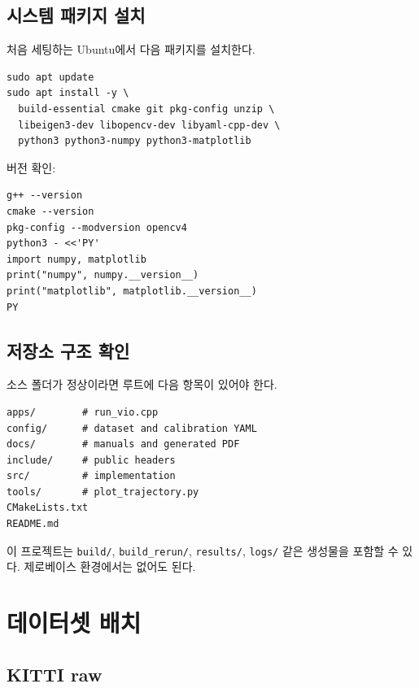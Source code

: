 \documentclass[11pt,a4paper,oneside]{report}
\begin{document}
\section{시스템 패키지 설치}

처음 세팅하는 Ubuntu에서 다음 패키지를 설치한다.

\begin{lstlisting}[style=shell,caption={필수 빌드 및 실행 의존성}]
sudo apt update
sudo apt install -y \
  build-essential cmake git pkg-config unzip \
  libeigen3-dev libopencv-dev libyaml-cpp-dev \
  python3 python3-numpy python3-matplotlib
\end{lstlisting}

버전 확인:

\begin{lstlisting}[style=shell,caption={도구 버전 확인}]
g++ --version
cmake --version
pkg-config --modversion opencv4
python3 - <<'PY'
import numpy, matplotlib
print("numpy", numpy.__version__)
print("matplotlib", matplotlib.__version__)
PY
\end{lstlisting}

\section{저장소 구조 확인}

소스 폴더가 정상이라면 루트에 다음 항목이 있어야 한다.

\begin{lstlisting}[style=shell,caption={루트 구조}]
apps/        # run_vio.cpp
config/      # dataset and calibration YAML
docs/        # manuals and generated PDF
include/     # public headers
src/         # implementation
tools/       # plot_trajectory.py
CMakeLists.txt
README.md
\end{lstlisting}

이 프로젝트는 \texttt{build/}, \texttt{build\_rerun/}, \texttt{results/}, \texttt{logs/} 같은
생성물을 포함할 수 있다. 제로베이스 환경에서는 없어도 된다.

\chapter{데이터셋 배치}

\section{KITTI raw}
\end{document}
